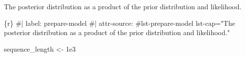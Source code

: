 \documentclass[
  letterpaper,
  DIV=11,
  numbers=noendperiod]{scrreprt}
\newenvironment{Shaded}{\begin{snugshade}}{\end{snugshade}}
\newcommand{\CommentTok}[1]{\textcolor[rgb]{0.37,0.37,0.37}{#1}}
\newcommand{\FloatTok}[1]{\textcolor[rgb]{0.68,0.00,0.00}{#1}}
\newcommand{\InformationTok}[1]{\textcolor[rgb]{0.37,0.37,0.37}{#1}}
\newcommand{\NormalTok}[1]{\textcolor[rgb]{0.00,0.23,0.31}{#1}}
\newcommand{\OtherTok}[1]{\textcolor[rgb]{0.00,0.23,0.31}{#1}}
\begin{document}
\begin{codelisting}

\caption{The posterior distribution as a product of the prior
distribution and likelihood.}

\hypertarget{lst-prepare-model}{%
\label{lst-prepare-model}}%
\begin{Shaded}
\begin{Highlighting}[]
\InformationTok{\textasciigrave{}\textasciigrave{}\textasciigrave{}\{r\}}
\CommentTok{\#| label: prepare{-}model}
\CommentTok{\#| attr{-}source: \textquotesingle{}\#lst{-}prepare{-}model lst{-}cap="The posterior distribution as a product of the prior distribution and likelihood."\textquotesingle{}}

\NormalTok{sequence\_length }\OtherTok{\textless{}{-}} \FloatTok{1e3}


\end{Highlighting}
\end{Shaded}
\end{codelisting}
\end{document}
